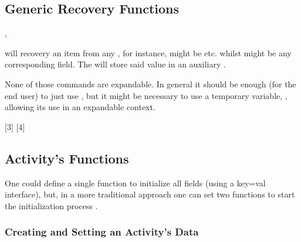 \documentclass[10pt]{article}
\begin{document}
\subsection{Generic Recovery Functions}\label{generic:datafield}

\begin{codedescribe}{\DataField,\DataGet}
  \begin{codesyntax}
  \end{codesyntax}
\tsobj{\DataField} will recovery an item from any , for instance,  might be  etc. whilst  might be any corresponding field. The \tsobj{\DataGet} will store said value in an auxiliary .
\begin{tsremark}
  None of those commands are expandable. In general it should be enough (for the end user) to just use \tsobj{\DataField}, but it might be necessary to use a temporary variable, , allowing  its use in an expandable context.
\end{tsremark}
\end{codedescribe}


[3]
[4]


\subsection{Activity's Functions}

One could define a single function to initialize all fields (using a key=val interface), but, in a more traditional approach  one can set two functions to start the initialization process \tsobj{\NewActivity,\ActivitySet}. 


\subsubsection{Creating and Setting an Activity's Data}
\end{document}
